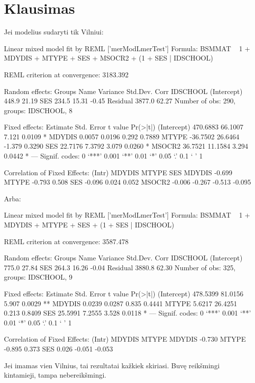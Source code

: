 \documentclass[a4paper]{article}
\begin{document}
\section{Klausimas}
Jei modelius sudaryti tik Vilniui:
\begin{Schunk}
\begin{Soutput}
Linear mixed model fit by REML ['merModLmerTest']
Formula: BSMMAT ~ 1 + MDYDIS + MTYPE + SES + MSOCR2 + (1 + SES | IDSCHOOL) 

REML criterion at convergence: 3183.392 

Random effects:
 Groups   Name        Variance Std.Dev. Corr 
 IDSCHOOL (Intercept)  448.9   21.19         
          SES          234.5   15.31    -0.45
 Residual             3877.0   62.27         
Number of obs: 290, groups: IDSCHOOL, 8

Fixed effects:
            Estimate Std. Error t value Pr(>|t|)  
(Intercept) 470.6883    66.1007   7.121   0.0109 *
MDYDIS        0.0057     0.0196   0.292   0.7889  
MTYPE       -36.7502    26.6464  -1.379   0.3290  
SES          22.7176     7.3792   3.079   0.0260 *
MSOCR2       36.7521    11.1584   3.294   0.0442 *
---
Signif. codes:  0 ‘***’ 0.001 ‘**’ 0.01 ‘*’ 0.05 ‘.’ 0.1 ‘ ’ 1

Correlation of Fixed Effects:
       (Intr) MDYDIS MTYPE  SES   
MDYDIS -0.699                     
MTYPE  -0.793  0.508              
SES    -0.096  0.024  0.052       
MSOCR2 -0.006 -0.267 -0.513 -0.095
\end{Soutput}
\end{Schunk}
Arba:
\begin{Schunk}
\begin{Soutput}
Linear mixed model fit by REML ['merModLmerTest']
Formula: BSMMAT ~ 1 + MDYDIS + MTYPE + SES + (1 + SES | IDSCHOOL) 

REML criterion at convergence: 3587.478 

Random effects:
 Groups   Name        Variance Std.Dev. Corr 
 IDSCHOOL (Intercept)  775.0   27.84         
          SES          264.3   16.26    -0.04
 Residual             3880.8   62.30         
Number of obs: 325, groups: IDSCHOOL, 9

Fixed effects:
            Estimate Std. Error t value Pr(>|t|)   
(Intercept) 478.5399    81.0156   5.907   0.0029 **
MDYDIS        0.0239     0.0287   0.835   0.4441   
MTYPE         5.6217    26.4251   0.213   0.8409   
SES          25.5991     7.2555   3.528   0.0118 * 
---
Signif. codes:  0 ‘***’ 0.001 ‘**’ 0.01 ‘*’ 0.05 ‘.’ 0.1 ‘ ’ 1

Correlation of Fixed Effects:
       (Intr) MDYDIS MTYPE 
MDYDIS -0.730              
MTYPE  -0.895  0.373       
SES     0.026 -0.051 -0.053
\end{Soutput}
\end{Schunk}
Jei imamas vien Vilnius, tai rezultatai kažkiek skiriasi. Buvę reikšmingi kintamieji, tampa nebereikšmingi.
\end{document}
